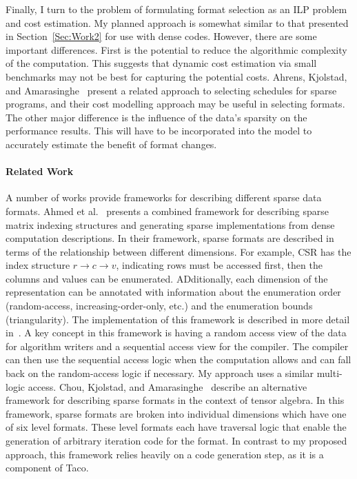 \documentclass{article}
\begin{document}
Finally, I turn to the problem of formulating format selection as an ILP problem and cost estimation.
My planned approach is somewhat similar to that presented in Section~\ref{Sec:Work2} for use with dense codes.
However, there are some important differences. 
First is the potential to reduce the algorithmic complexity of the computation. 
This suggests that dynamic cost estimation via small benchmarks may not be best for capturing the potential costs.
Ahrens, Kjolstad, and Amarasinghe~\cite{ahrens2021asymptotic} present a related approach to selecting schedules for sparse programs, and their cost modelling approach may be useful in selecting formats.
The other major difference is the influence of the data's sparsity on the performance results. 
This will have to be incorporated into the model to accurately estimate the benefit of format changes.



\paragraph{Related Work}

A number of works provide frameworks for describing different sparse data formats. 
Ahmed et al.~\cite{ahmed2000framework} presents a combined framework for describing sparse matrix indexing structures and generating sparse implementations from dense computation descriptions.
In their framework, sparse formats are described in terms of the relationship between different dimensions. For example, CSR has the index structure $r \rightarrow c \rightarrow v$, indicating rows must be accessed first, then the columns and values can be enumerated.
ADditionally, each dimension of the representation can be annotated with information about the enumeration order (random-access, increasing-order-only, etc.) and the enumeration bounds (triangularity).
The implementation of this framework is described in more detail in~\cite{mateev2000next}.
A key concept in this framework is having a random access view of the data for algorithm writers and a sequential access view for the compiler.
The compiler can then use the sequential access logic when the computation allows and can fall back on the random-access logic if necessary. 
My approach uses a similar multi-logic access.
Chou, Kjolstad, and Amarasinghe~\cite{chou2018format} describe an alternative framework for describing sparse formats in the context of tensor algebra. 
In this framework, sparse formats are broken into individual dimensions which have one of six level formats. 
These level formats each have traversal logic that enable the generation of arbitrary iteration code for the format.
In contrast to my proposed approach, this framework relies heavily on a code generation step, as it is a component of Taco.
\end{document}
